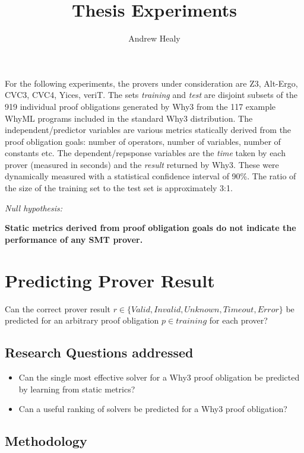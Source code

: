 \documentclass[]{article}
\title{Thesis Experiments}
\author{Andrew Healy}
\begin{document}
\maketitle

For the following experiments, the provers under consideration are Z3, Alt-Ergo, CVC3, CVC4, Yices, veriT. The sets \emph{training} and \emph{test} are disjoint subsets of the 919 individual proof obligations generated by Why3 from the 117 example WhyML programs included in the standard Why3 distribution. The independent/predictor variables are various metrics statically derived from the proof obligation goals: number of operators, number of variables, number of constants etc. The dependent/repsponse variables are the \emph{time} taken by each prover (measured in seconds) and the \emph{result} returned by Why3. These were dynamically measured with a statistical confidence interval of 90\%. The ratio of the size of the training set to the test set is approximately 3:1.
\vspace{0.4cm}

\textit{Null hypothesis:}

\textbf{Static metrics derived from proof obligation goals do not indicate the performance of any SMT prover.} 

\section{Predicting Prover Result}


Can the correct prover result $r \in \lbrace Valid, Invalid, Unknown, Timeout, Error \rbrace $ be predicted for an arbitrary proof obligation $p \in training$ for each prover?

\subsection{Research Questions addressed}

\begin{itemize}
\item{Can the single most effective solver for a Why3 proof obligation be predicted by learning from static metrics?}
\item{Can a useful ranking of solvers be predicted for a Why3 proof obligation?}
\end{itemize}

\subsection{Methodology}
\end{document}
